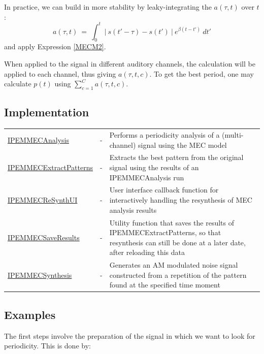In practice, we can build in more stability by leaky-integrating
the $a(\tau,t)$ over $t$:
\begin{equation}\label{MECM1B}
    a(\tau,t)~=~
    \int_{0}^{t}~\left|~
    s(t'-\tau)-s(t') ~\right|~
    e^{\beta(t-t')}~dt'
\end{equation}
and apply Expression \ref{MECM2}.

When applied to the signal in different auditory channels, the
calculation will be applied to each channel, thus giving
$a(\tau,t,c)$. To get the best period, one may calculate $p(t)$
using $\sum_{c=1}^{C}a(\tau,t,c)$.


\subsection{Implementation}

\begin{tabularx}{\linewidth}{llX}
\hyperlink{FuncRef:IPEMMECAnalysis}{IPEMMECAnalysis} & - & Performs a periodicity analysis of a (multi-channel) signal using the MEC model\\
\hyperlink{FuncRef:IPEMMECExtractPatterns}{IPEMMECExtractPatterns} & - & Extracts the best pattern from the original signal using the results of an IPEMMECAnalysis run\\
\hyperlink{FuncRef:IPEMMECReSynthUI}{IPEMMECReSynthUI} & - & User interface callback function for interactively handling the resynthesis of MEC analysis results\\
\hyperlink{FuncRef:IPEMMECSaveResults}{IPEMMECSaveResults} & - & Utility function that saves the results of IPEMMECExtractPatterns, so that resynthesis can still be done at a later date, after reloading this data\\
\hyperlink{FuncRef:IPEMMECSynthesis}{IPEMMECSynthesis} & - & Generates an AM modulated noise signal constructed from a repetition of the pattern found at the specified time moment\\
\end{tabularx}


\subsection{Examples}

The first steps involve the preparation of the signal in which we
want to look for periodicity. This is done by:\\

